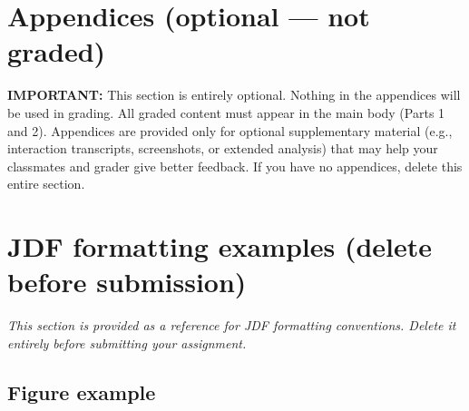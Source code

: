\documentclass[
	letterpaper, %
]{jdf}
\begin{document}
\section{Appendices (optional --- not graded)}

\textbf{IMPORTANT:} This section is entirely optional. Nothing in the appendices will be used in grading. All graded content must appear in the main body (Parts 1 and 2). Appendices are provided only for optional supplementary material (e.g., interaction transcripts, screenshots, or extended analysis) that may help your classmates and grader give better feedback. If you have no appendices, delete this entire section.


%



\section*{JDF formatting examples (delete before submission)}

\textit{This section is provided as a reference for JDF formatting conventions.
Delete it entirely before submitting your assignment.}

\subsection*{Figure example}
\end{document}
